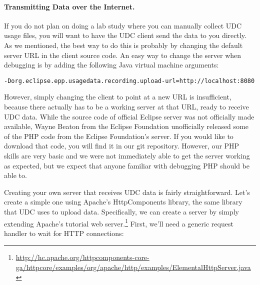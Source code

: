 \paragraph{Transmitting Data over the Internet.}

If you do not plan on doing a lab study where you can manually collect UDC usage
files, you will want to have the UDC client send the data to you directly.
As we mentioned, the best way to do this is probably by changing the default
server URL in the client source code.
An easy way to change the server when debugging is by adding the following Java
virtual machine arguments:

\vspace{4mm}
\texttt{-Dorg.eclipse.epp.usagedata.recording.upload-url=http://localhost:8080}
\vspace{4mm}

\noindent
However, simply changing the client to point at a new URL is insufficient,
because there actually has to be a working server at that URL, ready to
receive UDC data.
While the source code of official Eclipse server was not officially made
available, Wayne Beaton from the Eclipse Foundation unofficially released
some of the PHP code from the Eclipse Foundation's server.
If you would like to download that code, you will find it in our git repository.
However, our PHP skills are very basic and we were not immediately able
to get the server working as expected, but we expect that anyone familiar with
debugging PHP should be able to.

\newpage

Creating your own server that receives UDC data is fairly straightforward.
Let's create a simple one using Apache's HttpComponents library,
the same library that UDC uses to upload data.
Specifically, we can create a server by simply extending Apache's tutorial
web server.\footnote{\url{http://hc.apache.org/httpcomponents-core-ga/httpcore/examples/org/apache/http/examples/ElementalHttpServer.java}}
First, we'll need a generic request handler to wait for HTTP connections:

